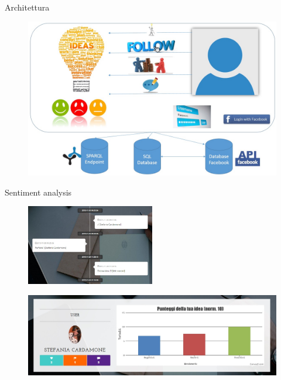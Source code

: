 \documentclass{beamer}
\begin{document}
\begin{frame}{Architettura}
	
	\begin{figure}
		\centering
			\includegraphics[width=1.00\textwidth]{img/1.jpg}
		\label{fig:architecture}
	\end{figure}
	
\end{frame}

\begin{frame}{Sentiment analysis}
	
	\begin{figure}
		\centering
			\includegraphics[width=0.5\textwidth]{img/comments.jpg}
		\label{fig:comments}
	\end{figure}
	
	\begin{figure}
		\centering
			\includegraphics[width=1.00\textwidth]{img/chart.jpg}
		\label{fig:chart}
	\end{figure}
	
	
\end{frame}
\end{document}
